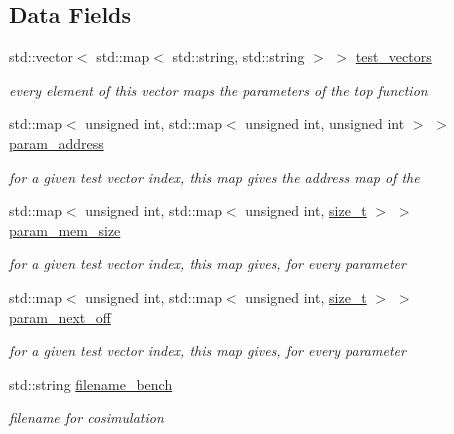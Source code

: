 \subsection*{Data Fields}
\begin{DoxyCompactItemize}
\item 
std\+::vector$<$ std\+::map$<$ std\+::string, std\+::string $>$ $>$ \hyperlink{classSimulationInformation_a2594fb526e8e327a65cd211abf67b65a}{test\+\_\+vectors}
\begin{DoxyCompactList}\small\item\em every element of this vector maps the parameters of the top function \end{DoxyCompactList}\item 
std\+::map$<$ unsigned int, std\+::map$<$ unsigned int, unsigned int $>$ $>$ \hyperlink{classSimulationInformation_a1750c1ab42e7f5e9f86e322cd76faedc}{param\+\_\+address}
\begin{DoxyCompactList}\small\item\em for a given test vector index, this map gives the address map of the \end{DoxyCompactList}\item 
std\+::map$<$ unsigned int, std\+::map$<$ unsigned int, \hyperlink{tutorial__fpt__2017_2intro_2sixth_2test_8c_a7c94ea6f8948649f8d181ae55911eeaf}{size\+\_\+t} $>$ $>$ \hyperlink{classSimulationInformation_adbb84c97177feabb6612994533ea4e4a}{param\+\_\+mem\+\_\+size}
\begin{DoxyCompactList}\small\item\em for a given test vector index, this map gives, for every parameter \end{DoxyCompactList}\item 
std\+::map$<$ unsigned int, std\+::map$<$ unsigned int, \hyperlink{tutorial__fpt__2017_2intro_2sixth_2test_8c_a7c94ea6f8948649f8d181ae55911eeaf}{size\+\_\+t} $>$ $>$ \hyperlink{classSimulationInformation_a455ec40895df5c01e1bb8f015717248c}{param\+\_\+next\+\_\+off}
\begin{DoxyCompactList}\small\item\em for a given test vector index, this map gives, for every parameter \end{DoxyCompactList}\item 
std\+::string \hyperlink{classSimulationInformation_af2a3e69959d0c6d5c4e3d348692a674e}{filename\+\_\+bench}
\begin{DoxyCompactList}\small\item\em filename for cosimulation \end{DoxyCompactList}\item 

\end{DoxyCompactItemize}
